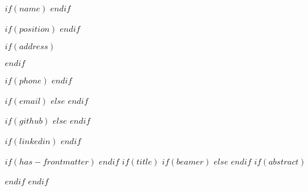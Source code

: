 
$if(name)$
$endif$

$if(position)$
$endif$

$if(address)$
\address{$address$}
$endif$

$if(phone)$
$endif$

$if(email)$
$else$
\email{}
$endif$

$if(github)$
$else$
\github{}
$endif$

$if(linkedin)$
$endif$

$if(has-frontmatter)$
\frontmatter
$endif$
$if(title)$
$if(beamer)$
\frame{\titlepage}
$else$
\makecvheader
$endif$
$if(abstract)$
\begin{abstract}
$abstract$
\end{abstract}
$endif$
$endif$